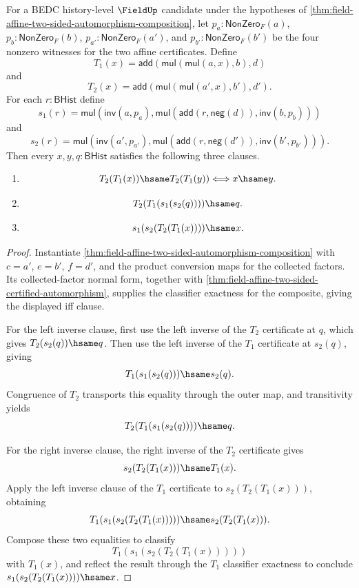 \begin{theorem}
\label{thm:field-affine-composite-two-sided-inverse}
For a BEDC history-level $\FieldUp$ candidate under the hypotheses of
\autoref{thm:field-affine-two-sided-automorphism-composition}, let
$p_a:\mathsf{NonZero}_F(a)$, $p_b:\mathsf{NonZero}_F(b)$,
$p_{a'}:\mathsf{NonZero}_F(a')$, and $p_{b'}:\mathsf{NonZero}_F(b')$ be the
four nonzero witnesses for the two affine certificates. Define
$$
T_1(x)=\mathsf{add}(\mathsf{mul}(\mathsf{mul}(a,x),b),d)
$$
and
$$
T_2(x)=\mathsf{add}(\mathsf{mul}(\mathsf{mul}(a',x),b'),d').
$$
For each $r:\mathsf{BHist}$ define
$$
s_1(r)=
\mathsf{mul}(\mathsf{inv}(a,p_a),
\mathsf{mul}(\mathsf{add}(r,\mathsf{neg}(d)),\mathsf{inv}(b,p_b)))
$$
and
$$
s_2(r)=
\mathsf{mul}(\mathsf{inv}(a',p_{a'}),
\mathsf{mul}(\mathsf{add}(r,\mathsf{neg}(d')),\mathsf{inv}(b',p_{b'}))).
$$
Then every $x,y,q:\mathsf{BHist}$ satisfies the following three clauses.
\begin{enumerate}
\item

$$
T_2(T_1(x))\hsame T_2(T_1(y)) \Longleftrightarrow x\hsame y.
$$
\item

$$
T_2(T_1(s_1(s_2(q))))\hsame q.
$$
\item

$$
s_1(s_2(T_2(T_1(x))))\hsame x.
$$
\end{enumerate}
\end{theorem}
\begin{proof}
Instantiate
\autoref{thm:field-affine-two-sided-automorphism-composition} with
$c=a'$, $e=b'$, $f=d'$, and the product conversion maps for the collected
factors. Its collected-factor normal form, together with
\autoref{thm:field-affine-two-sided-certified-automorphism}, supplies the
classifier exactness for the composite, giving the displayed iff clause.

For the left inverse clause, first use the left inverse of the $T_2$
certificate at $q$, which gives $T_2(s_2(q))\hsame q$. Then use the left
inverse of the $T_1$ certificate at $s_2(q)$, giving
$$
T_1(s_1(s_2(q)))\hsame s_2(q).
$$
Congruence of $T_2$ transports this equality through the outer map, and
transitivity yields
$$
T_2(T_1(s_1(s_2(q))))\hsame q.
$$

For the right inverse clause, the right inverse of the $T_2$ certificate gives
$$
s_2(T_2(T_1(x)))\hsame T_1(x).
$$
Apply the left inverse clause of the $T_1$ certificate to
$s_2(T_2(T_1(x)))$, obtaining
$$
T_1(s_1(s_2(T_2(T_1(x)))))\hsame s_2(T_2(T_1(x))).
$$
Compose these two equalities to classify
$$
T_1(s_1(s_2(T_2(T_1(x)))))
$$
with $T_1(x)$, and reflect the result through the $T_1$ classifier exactness to
conclude $s_1(s_2(T_2(T_1(x))))\hsame x$.
\end{proof}

